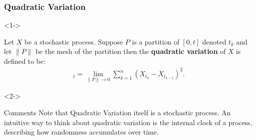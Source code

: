 \documentclass[10pt]{beamer}
\begin{document}
\begin{frame}[t]
  \frametitle{Quadratic Variation}
  \begin{onlyenv}<1->
    \begin{definition}
      Let $X$ be a stochastic process. Suppose $P$ is a partition of $[0,t]$ denoted $t_k$ and let $\lVert P \rVert$ be the mesh of the partition then the \textbf{quadratic variation} of $X$ is defined to be:
          \begin{align*}
            [X]_t = \lim\limits_{\lVert P \rVert \to 0} \displaystyle\sum_{k = 1}^{n}(X_{t_k} - X_{t_{k-1}})^2.
          \end{align*}
    \end{definition}
  \end{onlyenv}
  \begin{onlyenv}<2->
    \begin{block}{Comments}
      Note that Quadratic Variation itself is a stochastic process. An intuitive way to think about quadratic variation is the internal clock of a process, describing how randomness accumulates over time.
    \end{block}
  \end{onlyenv}
\end{frame}
\end{document}
